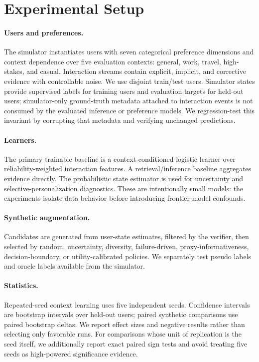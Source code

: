 \documentclass[10pt,twocolumn]{article}
\begin{document}
\section{Experimental Setup}
\paragraph{Users and preferences.}
The simulator instantiates users with seven categorical preference dimensions and context dependence over five evaluation contexts: general, work, travel, high-stakes, and casual. Interaction streams contain explicit, implicit, and corrective evidence with controllable noise. We use disjoint train/test users. Simulator states provide supervised labels for training users and evaluation targets for held-out users; simulator-only ground-truth metadata attached to interaction events is not consumed by the evaluated inference or preference models. We regression-test this invariant by corrupting that metadata and verifying unchanged predictions.

\paragraph{Learners.}
The primary trainable baseline is a context-conditioned logistic learner over reliability-weighted interaction features. A retrieval/inference baseline aggregates evidence directly. The probabilistic state estimator is used for uncertainty and selective-personalization diagnostics. These are intentionally small models: the experiments isolate data behavior before introducing frontier-model confounds.

\paragraph{Synthetic augmentation.}
Candidates are generated from user-state estimates, filtered by the verifier, then selected by random, uncertainty, diversity, failure-driven, proxy-informativeness, decision-boundary, or utility-calibrated policies. We separately test pseudo labels and oracle labels available from the simulator.

\paragraph{Statistics.}
Repeated-seed context learning uses five independent seeds. Confidence intervals are bootstrap intervals over held-out users; paired synthetic comparisons use paired bootstrap deltas. We report effect sizes and negative results rather than selecting only favorable runs. For comparisons whose unit of replication is the seed itself, we additionally report exact paired sign tests and avoid treating five seeds as high-powered significance evidence.
\end{document}
